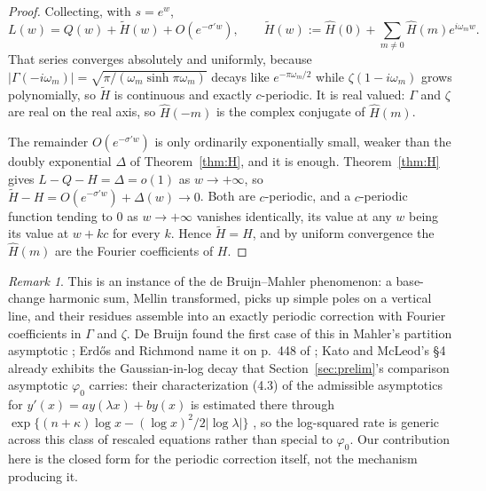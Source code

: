 \documentclass[11pt]{article}
\theoremstyle{definition}
\theoremstyle{remark}
\newtheorem{remark}[theorem]{Remark}
\begin{document}
\begin{proof}
Collecting, with $s=e^w$,
\[
L(w) = Q(w)+\widetilde H(w)+O(e^{-\sigma' w}), \qquad
\widetilde H(w) := \hat H(0)+\sum_{m\ne0}\hat H(m)e^{i\omega_m w}.
\]
That series converges absolutely and uniformly, because $|\Gamma(-i\omega_m)| =
\sqrt{\pi/(\omega_m\sinh\pi\omega_m)}$ decays like $e^{-\pi\omega_m/2}$ while $\zeta(1-i\omega_m)$
grows polynomially, so $\widetilde H$ is continuous and exactly $c$-periodic. It is real valued:
$\Gamma$ and $\zeta$ are real on the real axis, so $\hat H(-m)$ is the complex conjugate of
$\hat H(m)$.

The remainder $O(e^{-\sigma'w})$ is only ordinarily exponentially small, weaker than the doubly
exponential $\Delta$ of Theorem~\ref{thm:H}, and it is enough. Theorem~\ref{thm:H} gives
$L-Q-H=\Delta=o(1)$ as $w\to+\infty$, so $\widetilde H-H = O(e^{-\sigma'w})+\Delta(w)\to0$. Both are
$c$-periodic, and a $c$-periodic function tending to $0$ as $w\to+\infty$ vanishes identically, its
value at any $w$ being its value at $w+kc$ for every $k$. Hence $\widetilde H=H$, and by uniform
convergence the $\hat H(m)$ are the Fourier coefficients of $H$.
\end{proof}

\begin{remark}
This is an instance of the de Bruijn--Mahler phenomenon: a base-change harmonic sum, Mellin
transformed, picks up simple poles on a vertical line, and their residues assemble into an exactly
periodic correction with Fourier coefficients in $\Gamma$ and $\zeta$. De Bruijn found the first
case of this in Mahler's partition asymptotic \cite{DeBruijn1948}; Erd\H{o}s and Richmond name it
on p.~448 of \cite{ErdosRichmond1976}; Kato and McLeod's \S4 already exhibits the Gaussian-in-log decay that
Section~\ref{sec:prelim}'s comparison asymptotic $\varphi_0$ carries: their
characterization (4.3) of the admissible asymptotics for
$y'(x)=ay(\lambda x)+by(x)$ is estimated there through
$\exp\{(n+\kappa)\log x-(\log x)^2/2|\log\lambda|\}$
\cite[\S4, eqs.~(4.3), (4.9a)]{KatoMcLeod1971}, so the log-squared rate is
generic across this class of rescaled equations rather than special to
$\varphi_0$. Our contribution here is the closed form for the periodic correction itself, not the mechanism
producing it.
\end{remark}
\end{document}
